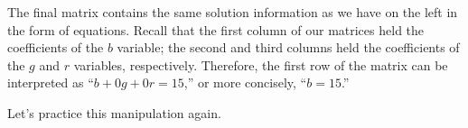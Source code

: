 The final matrix contains the same solution information as we have on the left in the form of equations. Recall that the first column of our matrices held the coefficients of the $b$ variable; the second and third columns held the coefficients of the $g$ and $r$ variables, respectively. Therefore, the first row of the matrix can be interpreted as ``$b+0g+0r=15$,'' or more concisely, ``$b=15$.''

Let's practice this manipulation again.\\

